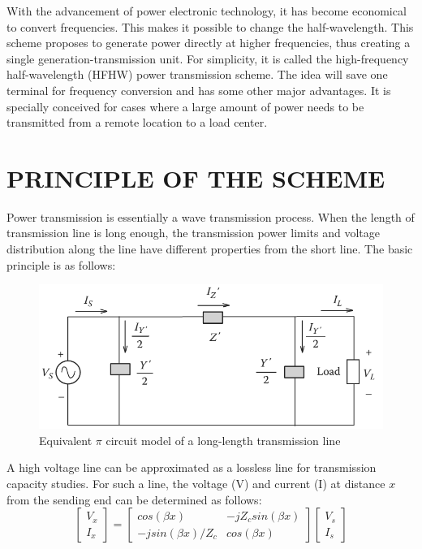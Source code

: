 \documentclass[12pt,a4paper]{reportmod}
\begin{document}
\par With the advancement of power electronic technology, it has become economical to convert frequencies. This makes it possible to change the half-wavelength. This scheme proposes to generate power directly at higher frequencies, thus creating a single generation-transmission unit. For simplicity, it is called the high-frequency half-wavelength (HFHW) power transmission scheme. The idea will save one terminal for frequency conversion and has some other major advantages. It is specially conceived for cases where a large amount of power needs to be transmitted from a remote location to a load center.

\chapter{PRINCIPLE OF THE SCHEME}
\par Power transmission is essentially a wave transmission process. When the length of transmission line is long enough, the transmission power limits and voltage distribution along the line have different properties from the short line. The basic principle is as follows:
\begin{figure}[h]
\label{fig:piequi}
\begin{center}
\includegraphics[scale=0.4]{piequi.png}
\caption{Equivalent $\pi$ circuit model of a long-length transmission line}
\end{center}
\end{figure}
\par A high voltage line can be approximated as a lossless line for transmission capacity studies. For such a line, the voltage (V) and current (I) at distance $x$ from the sending end can be determined as follows:
\begin{equation}\label{eqn:abcd}
\begin{bmatrix}
V_x\\
I_x
\end{bmatrix}
=
\begin{bmatrix}
cos(\beta x) & -jZ_c sin(\beta x)\\
-jsin(\beta x)/Z_c & cos(\beta x)
\end{bmatrix}
\begin{bmatrix}
V_s\\
I_s
\end{bmatrix}
\end{equation}
\end{document}
